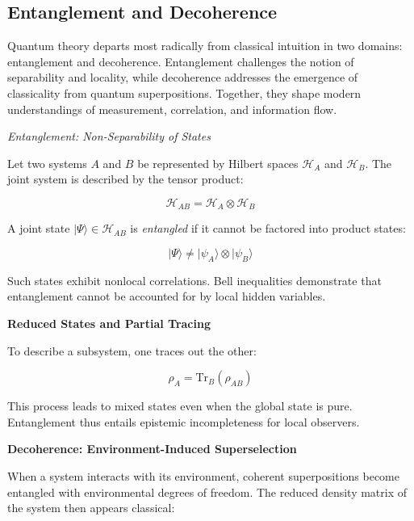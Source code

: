\documentclass[11pt]{article}
\numberwithin{equation}{section} %
\begin{document}
\subsection{Entanglement and Decoherence}

Quantum theory departs most radically from classical intuition in two domains: entanglement and decoherence. Entanglement challenges the notion of separability and locality, while decoherence addresses the emergence of classicality from quantum superpositions. Together, they shape modern understandings of measurement, correlation, and information flow.

\bigskip

\noindent \textit{Entanglement: Non-Separability of States}

Let two systems \( A \) and \( B \) be represented by Hilbert spaces \( \mathcal{H}_A \) and \( \mathcal{H}_B \). The joint system is described by the tensor product:

\begin{equation}
\mathcal{H}_{AB} = \mathcal{H}_A \otimes \mathcal{H}_B
\end{equation}

A joint state \( |\Psi\rangle \in \mathcal{H}_{AB} \) is \textit{entangled} if it cannot be factored into product states:

\begin{equation}
|\Psi\rangle \neq |\psi_A\rangle \otimes |\psi_B\rangle
\end{equation}

Such states exhibit nonlocal correlations. Bell inequalities demonstrate that entanglement cannot be accounted for by local hidden variables.

\bigskip

\noindent\textbf{Reduced States and Partial Tracing}

To describe a subsystem, one traces out the other:

\begin{equation}
\rho_A = \mathrm{Tr}_B(\rho_{AB})
\end{equation}

This process leads to mixed states even when the global state is pure. Entanglement thus entails epistemic incompleteness for local observers.

\bigskip

\noindent\textbf{Decoherence: Environment-Induced Superselection}

When a system interacts with its environment, coherent superpositions become entangled with environmental degrees of freedom. The reduced density matrix of the system then appears classical:
\end{document}
